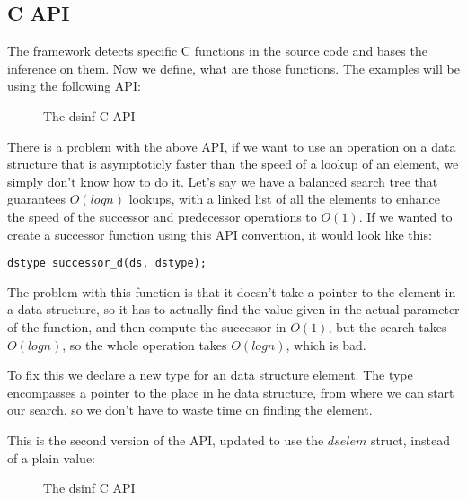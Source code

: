 \documentclass[a4paper,11pt]{article}
\begin{document}
	\subsection{C API}
        The framework detects specific C functions in the source code and bases the inference on them. Now we define,
        what are those functions.
		The examples will be using the following API:
        \begin{figure}[h!]
            

            \caption{The dsinf C API}

            \label{fig:C-api-v1}
        \end{figure}

        There is a problem with the above API, if we want to use an operation on a data structure that is asymptoticly
        faster than the speed of a lookup of an element, we simply don't know how to do it. Let's say we have a balanced
        search tree that guarantees $O(log n)$ lookups, with a linked list of all the elements  to
        enhance the speed of the successor and predecessor operations to $O(1)$. If we wanted to create a successor
        function using this API convention, it would look like this:

        \begin{lstlisting}
dstype successor_d(ds, dstype);
        \end{lstlisting}
        The problem with this function is that it doesn't take a pointer to the element in a data structure, so it has
        to actually find the value given in the actual parameter of the function, and then compute the successor in
        $O(1)$, but the search takes $O(log n)$, so the whole operation takes $O(log n)$, which is bad.

        To fix this we declare a new type for an data structure element. The type encompasses a pointer to the place in
        he data structure, from where we can start our search, so we don't have to waste time on finding the element.

        This is the second version of the API, updated to use the $dselem$ struct, instead of a plain value:

        \begin{figure}[h!]
            

            \caption{The dsinf C API}

            \label{fig:C-api-v2}
        \end{figure}
\end{document}
